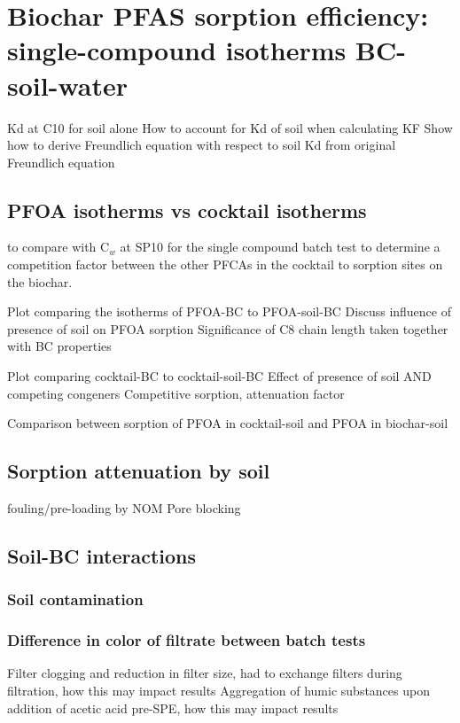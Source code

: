 \section{Biochar PFAS sorption efficiency: single-compound isotherms BC-soil-water}
Kd at C10 for soil alone
How to account for Kd of soil when calculating KF 
    Show how to derive Freundlich equation with respect to soil Kd from original Freundlich equation
    
\subsection{PFOA isotherms vs cocktail isotherms}
to compare with C$_w$ at SP10 for the single compound batch test to determine a competition factor between the other PFCAs in the cocktail to sorption sites on the biochar.

Plot comparing the isotherms of PFOA-BC to PFOA-soil-BC
Discuss influence of presence of soil on PFOA sorption
Significance of C8 chain length taken together with BC properties 

Plot comparing cocktail-BC to cocktail-soil-BC
Effect of presence of soil AND competing congeners
Competitive sorption, attenuation factor

Comparison between sorption of PFOA in cocktail-soil and PFOA in biochar-soil

\subsection{Sorption attenuation by soil}
fouling/pre-loading by NOM
Pore blocking

\subsection{Soil-BC interactions}

\subsubsection{Soil contamination}

\subsubsection{Difference in color of filtrate between batch tests}
Filter clogging and reduction in filter size, had to exchange filters during filtration, how this may impact results
Aggregation of humic substances upon addition of acetic acid pre-SPE, how this may impact results

